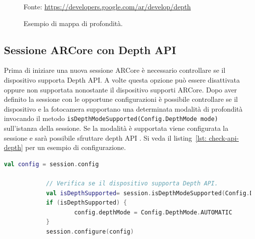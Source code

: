 \documentclass[crop=false, class=book]{standalone}
\begin{document}
		\begin{figure}[h]
			\centering
			{Fonte: \url{https://developers.google.com/ar/develop/depth}}
			\caption{Esempio di mappa di profondità.}
			\label{fig: depth-map}
		\end{figure}	
	
		\clearpage
	
		\subsection{Sessione ARCore con Depth API}
		
			Prima di iniziare una nuova sessione ARCore è necessario controllare se il dispositivo supporta Depth API. A volte questa opzione può essere disattivata oppure non supportata nonostante il dispositivo supporti ARCore. Dopo aver definito la sessione con le opportune configurazioni è possibile controllare se il dispositivo e la fotocamera supportano una determinata modalità di profondità invocando il metodo \verb|isDepthModeSupported(Config.DepthMode mode)| sull'istanza della sessione. Se la modalità è supportata viene configurata la sessione e sarà possibile sfruttare depth API \cite{google2022depth}. Si veda il listing~\vref{lst: check-api-depth} per un esempio di configurazione.
		
	\begin{center}
		\begin{minipage}{0.95\textwidth}
			\begin{lstlisting}[caption={Controllo supporto depth API.}, label={lst: check-api-depth}, language=Kotlin]
			val config = session.config

			// Verifica se il dispositivo supporta Depth API.
			val isDepthSupported= session.isDepthModeSupported(Config.DepthMode.AUTOMATIC)
			if (isDepthSupported) {
					config.depthMode = Config.DepthMode.AUTOMATIC
			}
			session.configure(config)
		
			\end{lstlisting}
		\end{minipage}
	\end{center}
		
\end{document}
